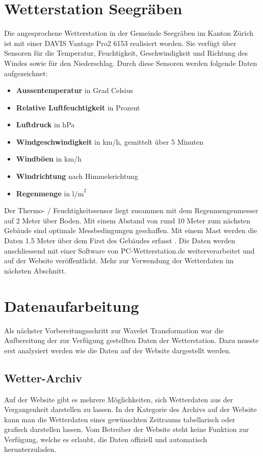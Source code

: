 \begin{refsection}
\section{Wetterstation Seegräben}

Die angesprochene Wetterstation in der Gemeinde Seegräben im Kanton Zürich ist mit einer DAVIS Vantage Pro2 6153 \cite{online:davisinstruments} realisiert worden.
Sie verfügt über Sensoren für die Temperatur, Feuchtigkeit, Geschwindigkeit und Richtung des Windes sowie für den Niederschlag. 
Durch diese Sensoren werden folgende Daten aufgezeichnet:


\begin{itemize}
	\item \textbf{Aussentemperatur} in Grad Celsius
	\item \textbf{Relative Luftfeuchtigkeit} in Prozent
	\item \textbf{Luftdruck} in hPa
	\item \textbf{Windgeschwindigkeit} in km/h, gemittelt über 5 Minuten
	\item \textbf{Windböen} in km/h
	\item \textbf{Windrichtung} nach Himmelsrichtung
	\item \textbf{Regenmenge} in $\text{l/m}^{2}$
\end{itemize}	


Der Thermo- / Feuchtigkeitssensor liegt zusammen mit dem Regenmengenmesser auf 2 Meter über Boden.
Mit einem Abstand von rund 10 Meter zum nächsten Gebäude sind optimale Messbedingungen geschaffen.
Mit einem Mast werden die Daten 1.5 Meter über dem First des Gebäudes erfasst \space \cite{online:wss}.
Die Daten werden anschliessend mit einer Software von PC-Wetterstation.de weiterverarbeitet und auf der Website veröffentlicht.
Mehr zur Verwendung der Wetterdaten im n\"achsten Abschnitt.

\section{Datenaufarbeitung}
Als n\"achster Vorbereitungsschritt zur Wavelet Transformation war die Aufbereitung der zur Verf\"ugung gestellten Daten der Wetterstation. Dazu musste erst analysiert werden wie die Daten auf der Website dargestellt werden.
\subsection{Wetter-Archiv}
Auf der Website gibt es mehrere Möglichkeiten, sich Wetterdaten aus der Vergangenheit darstellen zu lassen.
In der Kategorie des Archivs auf der Website kann man die Wetterdaten eines gew\"unschten Zeitraums tabellarisch oder grafisch darstellen lassen.
Vom Betreiber der Website steht keine Funktion zur Verfügung, welche es erlaubt, die Daten offiziell und automatisch herunterzuladen.

\end{refsection}
